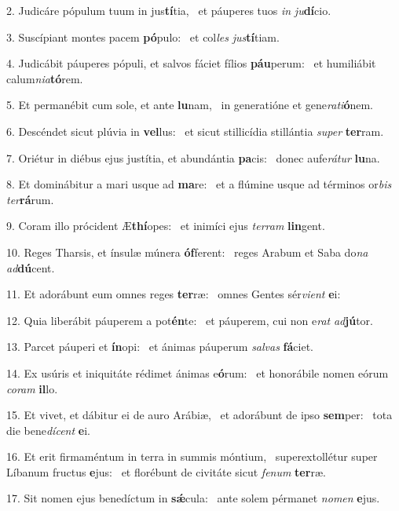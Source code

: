 2. Judicáre pópulum tuum in jus\textbf{tí}tia, \ast\  et páuperes tuos \textit{in} \textit{ju}\textbf{dí}cio.\

3. Suscípiant montes pacem \textbf{pó}pulo: \ast\  et col\textit{les} \textit{jus}\textbf{tí}tiam.\

4. Judicábit páuperes pópuli, et salvos fáciet fílios \textbf{páu}perum: \ast\  et humiliábit calum\textit{ni}\textit{a}\textbf{tó}rem.\

5. Et permanébit cum sole, et ante \textbf{lu}nam, \ast\  in generatióne et gene\textit{ra}\textit{ti}\textbf{ó}nem.\

6. Descéndet sicut plúvia in \textbf{vel}lus: \ast\  et sicut stillicídia stillántia \textit{su}\textit{per} \textbf{ter}ram.\

7. Oriétur in diébus ejus justítia, et abundántia \textbf{pa}cis: \ast\  donec aufe\textit{rá}\textit{tur} \textbf{lu}na.\

8. Et dominábitur a mari usque ad \textbf{ma}re: \ast\  et a flúmine usque ad términos or\textit{bis} \textit{ter}\textbf{rá}rum.\

9. Coram illo prócident Æ\textbf{thí}opes: \ast\  et inimíci ejus \textit{ter}\textit{ram} \textbf{lin}gent.\

10. Reges Tharsis, et ínsulæ múnera \textbf{óf}ferent: \ast\  reges Arabum et Saba do\textit{na} \textit{ad}\textbf{dú}cent.\

11. Et adorábunt eum omnes reges \textbf{ter}ræ: \ast\  omnes Gentes sér\textit{vi}\textit{ent} \textbf{e}i:\

12. Quia liberábit páuperem a pot\textbf{én}te: \ast\  et páuperem, cui non e\textit{rat} \textit{ad}\textbf{jú}tor.\

13. Parcet páuperi et \textbf{ín}opi: \ast\  et ánimas páuperum \textit{sal}\textit{vas} \textbf{fá}ciet.\

14. Ex usúris et iniquitáte rédimet ánimas e\textbf{ó}rum: \ast\  et honorábile nomen eórum \textit{co}\textit{ram} \textbf{il}lo.\

15. Et vivet, et dábitur ei de auro Arábiæ, \dag\  et adorábunt de ipso \textbf{sem}per: \ast\  tota die bene\textit{dí}\textit{cent} \textbf{e}i.\

16. Et erit firmaméntum in terra in summis móntium, \dag\  superextollétur super Líbanum fructus \textbf{e}jus: \ast\  et florébunt de civitáte sicut \textit{fe}\textit{num} \textbf{ter}ræ.\

17. Sit nomen ejus benedíctum in \textbf{sǽ}cula: \ast\  ante solem pérmanet \textit{no}\textit{men} \textbf{e}jus.\

